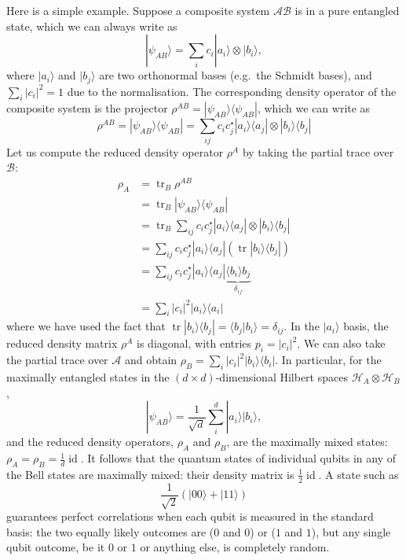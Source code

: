 \documentclass{article}
\begin{document}
Here is a simple example.
Suppose a composite system \(\mathcal{AB}\) is in a pure entangled state, which we can always write as
\[
  |\psi_{AB}\rangle
  = \sum_{i} c_{i} |a_i\rangle\otimes|b_i\rangle,
\]
where \(|a_i\rangle\) and \(|b_j\rangle\) are two orthonormal bases (e.g.~the Schmidt bases), and \(\sum_i |c_i|^2 = 1\) due to the normalisation.
The corresponding density operator of the composite system is the projector \(\rho^{AB}= |\psi_{AB}\rangle\langle\psi_{AB}|\), which we can write as
\[
  \rho^{AB}
  = |\psi_{AB}\rangle\langle\psi_{AB}|
  = \sum_{ij} c_i c^\star_j |a_i\rangle\langle a_j| \otimes |b_i\rangle\langle b_j|
\]
Let us compute the reduced density operator \(\rho^A\) by taking the partial trace over \(\mathcal{B}\):
\[
  \begin{aligned}
    \rho_A
    &= \operatorname{tr}_B\rho^{AB}
  \\&= \operatorname{tr}_B |\psi_{AB}\rangle\langle\psi_{AB}|
  \\&= \operatorname{tr}_B \sum_{ij} c_i c^\star_j |a_i\rangle\langle a_j| \otimes |b_i\rangle\langle b_j|
  \\&= \sum_{ij} c_i c^\star_j |a_i\rangle\langle a_j|(\operatorname{tr}|b_i\rangle\langle b_j|)
  \\&= \sum_{ij} c_i c^\star_j |a_i\rangle\langle a_j| \underbrace{\langle b_i\rangle{b_j}}_{\delta_{ij}}
  \\& = \sum_{i} |c_i|^2 |a_i\rangle\langle a_i|
  \end{aligned}
\]
where we have used the fact that \(\operatorname{tr}|b_i\rangle\langle b_j| = \langle b_j|b_i\rangle=\delta_{ij}\).
In the \(|a_i\rangle\) basis, the reduced density matrix \(\rho^A\) is diagonal, with entries \(p_i=|c_i|^2\).
We can also take the partial trace over \(\mathcal{A}\) and obtain \(\rho_B = \sum_{i} |c_i|^2 |b_i\rangle\langle b_i|\).
In particular, for the maximally entangled states in the \((d\times d)\)-dimensional Hilbert spaces \(\mathcal{H}_A\otimes\mathcal{H}_B\),
\[
  |\psi_{AB}\rangle
  = \frac{1}{\sqrt{d}} \sum_{i}^d |a_i\rangle|b_i\rangle,
\]
and the reduced density operators, \(\rho_A\) and \(\rho_B\), are the maximally mixed states: \(\rho_A=\rho_B=\frac{1}{d}\operatorname{id}\).
It follows that the quantum states of individual qubits in any of the Bell states are maximally mixed: their density matrix is \(\frac12\operatorname{id}\).
A state such as
\[
  \frac{1}{\sqrt 2} \left( |00\rangle + |11\rangle \right)
\]
guarantees perfect correlations when each qubit is measured in the standard basis: the two equally likely outcomes are (\(0\) and \(0\)) or (\(1\) and \(1\)), but any single qubit outcome, be it \(0\) or \(1\) or anything else, is completely random.
\end{document}
